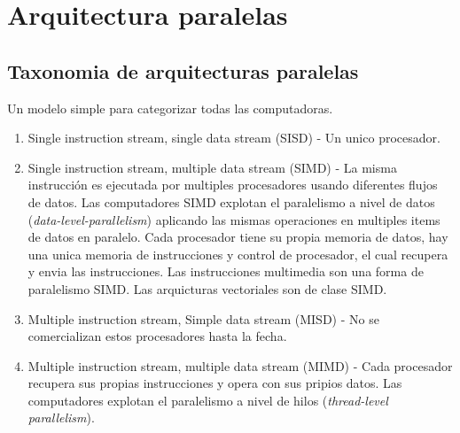 \documentclass{article}
\begin{document}
\newpage
\section{Arquitectura paralelas}

\subsection{Taxonomia de arquitecturas paralelas}
Un modelo simple para categorizar todas las computadoras.
\begin{enumerate}
    \item Single instruction stream, single data stream (SISD) - Un unico procesador.
    \item Single instruction stream, multiple data stream (SIMD) - La misma instrucción es ejecutada por multiples procesadores usando diferentes flujos de datos. Las computadores SIMD explotan el paralelismo a nivel de datos (\textit{data-level-parallelism}) aplicando las mismas operaciones en multiples items de datos en paralelo. Cada procesador tiene su propia memoria de datos, hay una unica memoria de instrucciones y control de procesador, el cual recupera y envia las instrucciones. Las instrucciones multimedia son una forma de paralelismo SIMD. Las arquicturas vectoriales son de clase SIMD.
    \item Multiple instruction stream, Simple data stream (MISD) - No se comercializan estos procesadores hasta la fecha.
    \item Multiple instruction stream, multiple data stream (MIMD) - Cada procesador recupera sus propias instrucciones y opera con sus pripios datos. Las computadores explotan el paralelismo a nivel de hilos (\textit{thread-level parallelism}).
\end{enumerate}
\end{document}
